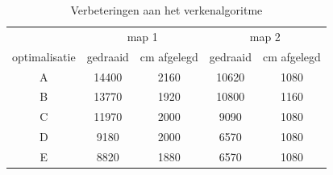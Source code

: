 \documentclass[tt1]{penoverslag}
\begin{document}
\begin{table}[!hb]
\begin{center}
    \begin{tabular}{ c ||  c | c | c | c }
     & \multicolumn{2}{|c|}{map 1}& \multicolumn{2}{|c}{map 2} \\
    optimalisatie & gedraaid & cm afgelegd & gedraaid & cm afgelegd\\ \hline \hline
    A & 14400 & 2160 & 10620 & 1080 \\ \hline
    B & 13770 & 1920 & 10800 & 1160 \\ \hline
    C & 11970 & 2000 & 9090 & 1080 \\ \hline
    D & 9180 & 2000 & 6570 & 1080\\ \hline
    E & 8820 & 1880 & 6570 & 1080\\
    \end{tabular}
    \caption{Verbeteringen aan het verkenalgoritme}
    \label{tab:resultVerken}
\end{center}
\end{table}
\end{document}
